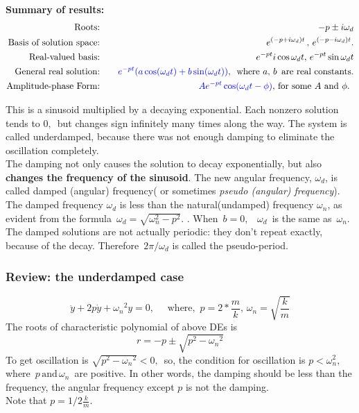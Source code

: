 \textbf{Summary of results:}
\begin{eqnarray*}
  \text{Roots:}  & \quad
  & -p \pm i \omega _ d \\
  \text{Basis of solution space:} & \quad
  & \displaystyle e^{(-p + i \omega _ d) t}\, , \, e^{(-p -i\omega _ d) t}. \\
  \text{Real-valued basis:} & \quad
  & \displaystyle e^{-p t}  i\cos \omega _ d t, \, e^{-p t} \sin \omega _ d t \\
  \text{General real solution:}	& \quad
  & \displaystyle {\color{blue}{e^{-p t} (a \cos (\omega _ d t) + b \sin (\omega _ d t))}}
    , \, \text{ where $a, \, b \, $ are real constants.} \\
  \text{Amplitude-phase Form:}	& \quad
  & \displaystyle {\color{blue}{A e^{-pt}\cos (\omega _ d t - \phi ) }}
    , \, \text{for some $A$ and $\phi$. }
\end{eqnarray*}

This is a sinusoid multiplied by a decaying exponential. Each nonzero solution tends to $0 , \,$
but changes sign infinitely many times along the way.
The system is called {\color{blue} underdamped}, because there was not enough damping
to eliminate the oscillation completely.\\

The damping not only causes the solution to decay exponentially, but also
\textbf{ changes the frequency of the sinusoid}.
The new angular frequency, $\omega _ d$, is called {\color{blue}damped (angular) frequency}( or
sometimes \textit{pseudo (angular) frequency}). \\

The damped frequency $\omega _d$ is less than the natural(undamped) frequency $\omega _n$, as evident
from the formula $\, \omega _ d=\sqrt {\omega _ n^2-p^2}.\, \,$.
When $\, b=0,$ \, $\omega _ d\,$ is the same as $\, \omega _ n$. \\

The damped solutions are not actually periodic:
they don't repeat exactly, because of the decay.
Therefore $\, 2\pi /\omega _ d$  is called the {\color{blue}pseudo-period}.

\subsubsection{Review: the underdamped case}

\begin{equation*}
  \ddot{y} + 2p \dot{y} + {\omega _n}^2 y = 0,
  \quad \text{ where, } \, p = 2 * \frac{m}{k} , \, \omega _n = \sqrt{\frac{k}{m}} 
\end{equation*}
The roots of characteristic polynomial of above DEs is
\begin{equation*}
  r = -p \pm \sqrt{p^2 - {\omega _n}^2}
\end{equation*}
To get oscillation is $ \sqrt{p^2 - {\omega _n}^2} < 0 ,\,$
so, the condition for oscillation is $ p < \omega _n ^2 , \, $
where $\, p \, \text{and} \, \omega _n \, $ are positive.
In other words,  the damping should be less
than the frequency, the angular frequency except $p$ is not the damping.\\

Note that $p = 1/2 \frac{k}{m}$. \\








